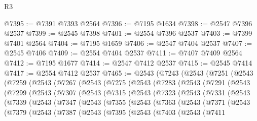 \begin{lexlean}{R3}
\begin{coremodule}
@7395 := @7391 @7393 @2564
@7396 := @7195 @1634
@7398 := @2547 @7396 @2537
@7399 := @2545 @7398
@7401 := @2554 @7396 @2537
@7403 := @7399 @7401 @2564
@7404 := @7195 @1659
@7406 := @2547 @7404 @2537
@7407 := @2545 @7406
@7409 := @2554 @7404 @2537
@7411 := @7407 @7409 @2564
@7412 := @7195 @1677
@7414 := @2547 @7412 @2537
@7415 := @2545 @7414
@7417 := @2554 @7412 @2537
@7465 := @2543
    (@7243
      (@2543
        (@7251
          (@2543
            (@7259
              (@2543
                (@7267
                  (@2543
                    (@7275
                      (@2543
                        (@7283
                          (@2543
                            (@7291
                              (@2543
                                (@7299
                                  (@2543
                                    (@7307
                                      (@2543
                                        (@7315
                                          (@2543
                                            (@7323
                                              (@2543
                                                (@7331
                                                  (@2543
                                                    (@7339
                                                      (@2543
                                                        (@7347
                                                          (@2543
                                                            (@7355
                                                              (@2543
                                                                (@7363
                                                                  (@2543
                                                                    (@7371
                                                                      (@2543
                                                                        (@7379
                                                                          (@2543
                                                                            (@7387
                                                                              (@2543
                                                                                (@7395
                                                                                  (@2543
                                                                                    (@7403
                                                                                      (@2543
                                                                                        (@7411

\end{coremodule}
\end{lexlean}
